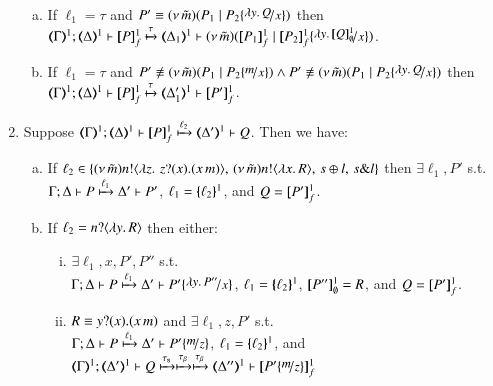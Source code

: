 \begin{proposition}
\begin{enumerate}[1.]
\begin{enumerate}[a)]
				\item
					If $\ell_1 = \tau$
					and $P' \scong \newsp{\tilde{m}}{P_1 \Par P_2 \subst{\abs{y}Q}{x}}$
					then \\
					$\horel{\tmap{\Gamma}{1}}{\tmap{\Delta}{1}}{\pmapp{P}{1}{f}}{\hby{\tau}}
					{\tmap{\Delta_1}{1}}{\newsp{\tilde{m}}{\pmapp{P_1}{1}{f}\Par \pmapp{P_2}{1}{f}\subst{\abs{y}\pmapp{Q}{1}{\emptyset}}{x}}}$.
			
				\item
					If $\ell_1 = \tau$
					and $P' \not\scong \newsp{\tilde{m}}{P_1 \Par P_2 \subst{m}{x}} \land P' \not\scong \newsp{\tilde{m}}{P_1 \Par P_2\subst{\abs{y}Q}{x}}$
					then \\
					$\horel{\tmap{\Gamma}{1}}{\tmap{\Delta}{1}}{\pmapp{P}{1}{f}}{\hby{\tau}}{\tmap{\Delta'_1}{1}}{ \pmapp{P'}{1}{f}}$.
			\end{enumerate}
			
		\item	Suppose $\horel{\tmap{\Gamma}{1}}{\tmap{\Delta}{1}}{\pmapp{P}{1}{f}}{\hby{\ell_2}}{\tmap{\Delta'}{1}}{Q}$.
			Then we have:
%
			\begin{enumerate}[a)]
				\item 
					If $\ell_2 \in
					\{(\nu\, \tilde{m})n ! \langle \lambda z.\,\,z ? (x) . (x\, {m}) \rangle, \,(\nu\, \tilde{m}) n ! \langle \lambda x.\,R \rangle, \,s \oplus l, \,s \& l\}$
					then $\exists \ell_1, P'$ s.t. \\
					$\Gamma; \Delta \vdash P \xmapsto{\ell_1} \Delta' \vdash P'$, 
					$\ell_1 = \{\!\!\{\ell_2\}\!\!\}^{1}$, 
					and
					$Q = [\!\![P']\!\!]^1_f$.
			
				\item 
					If $\ell_2 = n ? \langle \lambda y.\,R \rangle$ %
					then either:
%
					\begin{enumerate}[(i)]
						\item	$\exists \ell_1, x, P', P''$ s.t. \\
							$\horel{\Gamma}{\Delta}{P}{\hby{\ell_1}}{\Delta'}{P' \subst{\abs{y}P''}{x}}$, 
							$\ell_1 = \{\!\!\{\ell_2\}\!\!\}^{1}$, $[\!\![P'']\!\!]^1_\emptyset = R$, and $Q = [\!\![P']\!\!]^1_f$.

						\item	$R \equiv y ? (x) . (x\, {m})$ and 
							$\exists \ell_1, z, P'$ s.t. \\
							$\horel{\Gamma}{\Delta}{P}{\hby{\ell_1}}{\Delta'}{P' \subst{m}{z}}$, 
							$\ell_1 = \{\!\!\{\ell_2\}\!\!\}^{1}$,
							and\\
							$\horel{\tmap{\Gamma}{1}}{\tmap{\Delta'}{1}}{Q}{\hby{\stau} \hby{\btau} \hby{\btau}}{\tmap{\Delta''}{1}}{\pmapp{P'\subst{m}{z}}{1}{f}}$
					\end{enumerate}
			

\end{enumerate}
\end{enumerate}
\end{proposition}
